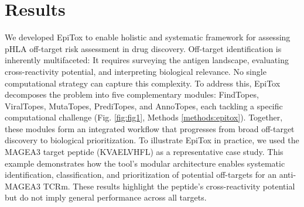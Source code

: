 \documentclass[times, twoside, watermark]{zHenriquesLab-StyleBioRxiv}
\begin{document}
\section*{Results}\label{results} 
    We developed EpiTox to enable holistic and systematic framework for assessing pHLA off-target risk assessment in drug discovery. Off-target identification is inherently multifaceted: It requires surveying the antigen landscape, evaluating cross-reactivity potential, and interpreting biological relevance. No single computational strategy can capture this complexity. To address this, EpiTox decomposes the problem into five complementary modules: FindTopes, ViralTopes, MutaTopes, PrediTopes, and AnnoTopes, each tackling a specific computational challenge (Fig. \ref{fig:fig1}, Methods \ref{methods:epitox}). Together, these modules form an integrated workflow that progresses from broad off-target discovery to biological prioritization.
    To illustrate EpiTox in practice, we used the MAGEA3 target peptide (KVAELVHFL) as a representative case study. This example demonstrates how the tool's modular architecture enables systematic identification, classification, and prioritization of potential off-targets for an anti-MAGEA3 TCRm. These results highlight the peptide's cross-reactivity potential but do not imply general performance across all targets.
\end{document}
